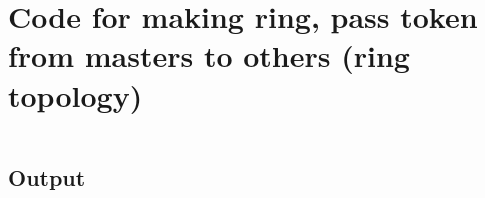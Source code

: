 \section{Code for making ring, pass token from masters to others (ring topology)}
\inputminted{c}{src/3.ring.c}

\subsection*{Output}
\inputminted{text}{src/output_ring.txt}

